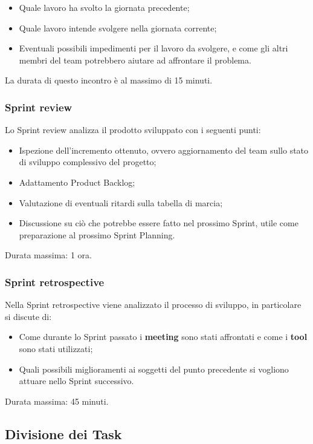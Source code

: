 \begin{itemize}
    \item Quale lavoro ha svolto la giornata precedente;
    \item Quale lavoro intende svolgere nella giornata corrente;
    \item Eventuali possibili impedimenti per il lavoro da svolgere, e come gli altri membri del team potrebbero aiutare ad affrontare il problema.
\end{itemize}

La durata di questo incontro è al massimo di 15 minuti.

\subsubsection{Sprint review}
Lo Sprint review analizza il prodotto sviluppato con i seguenti punti:

\begin{itemize}
    \item Ispezione dell'incremento ottenuto, ovvero aggiornamento del team sullo stato di sviluppo complessivo del progetto;
    \item Adattamento Product Backlog;
    \item Valutazione di eventuali ritardi sulla tabella di marcia;
    \item Discussione su ciò che potrebbe essere fatto nel prossimo Sprint, utile come preparazione al prossimo Sprint Planning.
\end{itemize}

Durata massima: 1 ora.

\subsubsection{Sprint retrospective}
Nella Sprint retrospective viene analizzato il processo di sviluppo, in particolare si discute di:

\begin{itemize}
    \item Come durante lo Sprint passato i \textbf{meeting} sono stati affrontati e come i \textbf{tool} sono stati utilizzati;
    \item Quali possibili miglioramenti ai soggetti del punto precedente si vogliono attuare nello Sprint successivo.
\end{itemize}

Durata massima: 45 minuti.

\subsection{Divisione dei Task}

